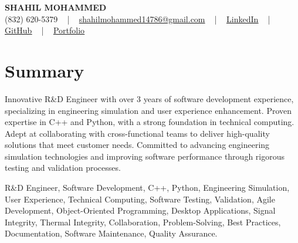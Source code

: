 \documentclass[letterpaper,10pt]{article}
\begin{document}
\begin{center}
    {\fontsize{14pt}{12pt}\selectfont \textbf{\MakeUppercase{Shahil Mohammed}}}\\ \vspace{2pt}
    \fontsize{10pt}{12pt}\selectfont (832) 620-5379 ~ | ~ \href{mailto:shahilmohammed14786@gmail.com}{shahilmohammed14786@gmail.com} ~ | ~  
    \href{https://www.linkedin.com/in/shahil-mohammed-9652931a1/}{\color{blue}\underline{LinkedIn}}  ~ | ~ 
    \href{https://github.com/freakbeast14}{\color{blue}\underline{GitHub}} ~ | ~ 
    \href{https://shahil-mohammed.netlify.app/}{\color{blue}\underline{Portfolio}}
    \vspace{-8pt}
\end{center}

\section{Summary}
\vspace{-2pt}\fontsize{8pt}{9pt}\selectfont
Innovative R&D Engineer with over 3 years of software development experience, specializing in engineering simulation and user experience enhancement. Proven expertise in C++ and Python, with a strong foundation in technical computing. Adept at collaborating with cross-functional teams to deliver high-quality solutions that meet customer needs. Committed to advancing engineering simulation technologies and improving software performance through rigorous testing and validation processes. 
 \vspace{-5pt}
 
{\fontsize{1pt}{1pt}\selectfont\color{white}
R&D Engineer, Software Development, C++, Python, Engineering Simulation, User Experience, Technical Computing, Software Testing, Validation, Agile Development, Object-Oriented Programming, Desktop Applications, Signal Integrity, Thermal Integrity, Collaboration, Problem-Solving, Best Practices, Documentation, Software Maintenance, Quality Assurance.
}
\vspace{-8pt}

\vspace{-2pt}
\end{document}
